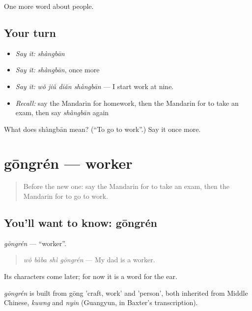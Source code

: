 \begin{grammarlens}[title={What you've built}]
One more word about people.
\end{grammarlens}

\subsection*{Your turn}
\begin{itemize}
\raggedright
  \item \emph{Say it:} \emph{shàngbān}
  \item \emph{Say it:} \emph{shàngbān}, once more
  \item \emph{Say it:} \emph{wǒ jiǔ diǎn shàngbān} — I start work at nine.
  \item \emph{Recall:} say the Mandarin for homework, then the Mandarin for to take an exam, then say \emph{shàngbān} again
\end{itemize}

\begin{tcolorbox}[breakable,colback=teal!4,colframe=teal!35!black,title={Before you move on}]
What does shàngbān mean? (\textquotedblleft{}To go to work\textquotedblright{}.) Say it once more.
\end{tcolorbox}
\section[gōngrén]{gōngrén — worker}

\label{lesson:ZH-C80-gongren}



\begin{quote}
Before the new one: say the Mandarin for to take an exam, then the Mandarin for to go to work.
\end{quote}

\subsection*{You'll want to know: gōngrén}
\emph{gōngrén} — \textquotedblleft{}worker\textquotedblright{}.

\begin{quote}
\emph{wǒ bàba shì gōngrén} — My dad is a worker.
\end{quote}

Its characters come later; for now it is a word for the ear.

\begin{cousinweb}
\emph{gōngrén} is built from gōng 'craft, work' and  'person', both inherited from Middle Chinese, \emph{kuwng} and \emph{nyin} (Guangyun, in Baxter's transcription).
\end{cousinweb}

